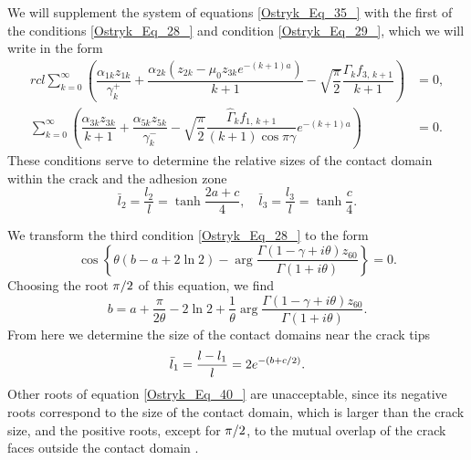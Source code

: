 We will supplement the system of equations \eqref{Ostryk_Eq_35_} with the first of the conditions \eqref{Ostryk_Eq_28_} and condition \eqref{Ostryk_Eq_29_}, which we will write in the form
\begin{equation} \label{Ostryk_Eq_37_} 
\begin{aligned}{rcl}
	\displaystyle\sum _{k=0}^{\infty }\left(\dfrac{\alpha _{1k} z_{1k} }{\gamma _{k}^{+} } +\dfrac{\alpha _{2k} (z_{2k} -\mu _{0} z_{3k} e^{-(k+1)a} )}{k+1} -\sqrt{\dfrac{\pi }{2} } \dfrac{\Gamma _{k} f_{3,\, k+1} }{k+1} \right)&=0 ,
	\\
	\displaystyle\sum _{k=0}^{\infty }\left(\dfrac{\alpha _{3k} z_{3k} }{k+1} +\dfrac{\alpha _{5k} z_{5k} }{\gamma _{k}^{-} } -\sqrt{\dfrac{\pi }{2} } \dfrac{\hat{\Gamma }_{k} f_{1,\, k+1} }{(k+1)\cos \pi \gamma } e^{-(k+1)a} \right) &=0.  
\end{aligned}
\end{equation} 
These conditions serve to determine the relative sizes of the contact domain within the crack and the adhesion zone
\begin{equation} \label{Ostryk_Eq_38_} 
\bar{l}_{2} =\dfrac{l_{2} }{l} =\tanh \dfrac{2a+c}{4} ,\quad    \bar{l}_{3} =\dfrac{l_{3} }{l} =\tanh \dfrac{c}{4} .  
\end{equation} 

We transform the third condition \eqref{Ostryk_Eq_28_} to the form
\begin{equation} \label{Ostryk_Eq_39_} 
\cos \left\{\theta (b-a+2\ln 2)-\arg \dfrac{\Gamma (1-\gamma +i\theta )z_{60} }{\Gamma (1+i\theta )} \right\}=0.  
\end{equation} 
Choosing the root ${\pi \mathord{\left/ {\vphantom {\pi  2}} \right. \kern-\nulldelimiterspace} 2} $ of this equation, we find
\begin{equation} \label{Ostryk_Eq_40_} 
b=a+\dfrac{\pi }{2\theta } -2\ln 2+\dfrac{1}{\theta } \arg \dfrac{\Gamma (1-\gamma +i\theta )z_{60} }{\Gamma (1+i\theta )} .  
\end{equation} 
From here we determine the size of the contact domains near the crack tips
\begin{equation} \label{Ostryk_Eq_41_} 
\bar{l}_{1} =\dfrac{l-l_{1} }{l} =2e^{-(b+{c\mathord{\left/ {\vphantom {c 2}} \right. \kern-\nulldelimiterspace} 2} )} .  
\end{equation} 
Other roots of equation \eqref{Ostryk_Eq_40_} are unacceptable, since its negative roots correspond to the size of the contact domain, which is larger than the crack size, and the positive roots, except for ${\pi \mathord{\left/ {\vphantom {\pi  2}} \right. \kern-\nulldelimiterspace} 2} $, to the mutual overlap of the crack faces outside the contact domain \cite{Ostryk38}.





